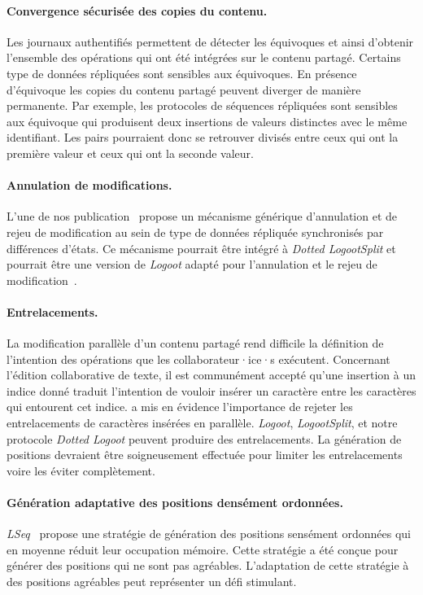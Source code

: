 \paragraph{Convergence sécurisée des copies du contenu.} Les journaux authentifiés permettent de détecter les équivoques et ainsi d'obtenir l'ensemble des opérations qui ont été intégrées sur le contenu partagé.
Certains type de données répliquées sont sensibles aux équivoques.
En présence d'équivoque les copies du contenu partagé peuvent diverger de manière permanente.
Par exemple, les protocoles de séquences répliquées sont sensibles aux équivoque qui produisent deux insertions de valeurs distinctes avec le même identifiant.
Les pairs pourraient donc se retrouver divisés entre ceux qui ont la première valeur et ceux qui ont la seconde valeur.

\paragraph{Annulation de modifications.} L'une de nos publication~\autocite{2019_yu_genericundo} propose un mécanisme générique d'annulation et de rejeu de modification au sein de type de données répliquée synchronisés par différences d'états.
Ce mécanisme pourrait être intégré à \emph{Dotted LogootSplit} et pourrait être une version de \emph{Logoot} adapté pour l'annulation et le rejeu de modification~\autocite{weiss2010logoot}.

\paragraph{Entrelacements.} La modification parallèle d'un contenu partagé rend difficile la définition de l'intention des opérations que les collaborateur·ice·s exécutent.
Concernant l'édition collaborative de texte, il est communément accepté qu'une insertion à un indice donné traduit l'intention de vouloir insérer un caractère entre les caractères qui entourent cet indice.
\textcite{kleppmann2019_interleaving} a mis en évidence l'importance de rejeter les entrelacements de caractères insérées en parallèle.
\emph{Logoot}, \emph{LogootSplit}, et notre protocole \emph{Dotted Logoot} peuvent produire des entrelacements.
La génération de positions devraient être soigneusement effectuée pour limiter les entrelacements voire les éviter complètement.

\paragraph{Génération adaptative des positions densément ordonnées.} \emph{LSeq}~\autocite{nedelec_2013_lseq} propose une stratégie de génération des positions sensément ordonnées qui en moyenne réduit leur occupation mémoire.
Cette stratégie a été conçue pour générer des positions qui ne sont pas agréables.
L'adaptation de cette stratégie à des positions agréables peut représenter un défi stimulant.

